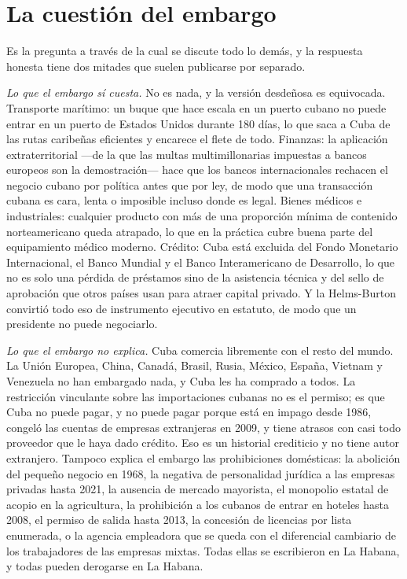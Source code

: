 \section{La cuestión del embargo}

Es la pregunta a través de la cual se discute todo lo demás, y la respuesta honesta
tiene dos mitades que suelen publicarse por separado.

\emph{Lo que el embargo sí cuesta.} No es nada, y la versión desdeñosa es
equivocada. Transporte marítimo: un buque que hace escala en un puerto cubano no
puede entrar en un puerto de Estados Unidos durante 180 días, lo que saca a Cuba de
las rutas caribeñas eficientes y encarece el flete de todo. Finanzas: la aplicación
extraterritorial ---de la que las multas multimillonarias impuestas a bancos
europeos son la demostración--- hace que los bancos internacionales rechacen el
negocio cubano por política antes que por ley, de modo que una transacción cubana es
cara, lenta o imposible incluso donde es legal. Bienes médicos e industriales:
cualquier producto con más de una proporción mínima de contenido norteamericano
queda atrapado, lo que en la práctica cubre buena parte del equipamiento médico
moderno. Crédito: Cuba está excluida del Fondo Monetario Internacional, el Banco
Mundial y el Banco Interamericano de Desarrollo, lo que no es solo una pérdida de
préstamos sino de la asistencia técnica y del sello de aprobación que otros países
usan para atraer capital privado. Y la Helms-Burton convirtió todo eso de
instrumento ejecutivo en estatuto, de modo que un presidente no puede negociarlo.

\emph{Lo que el embargo no explica.} Cuba comercia libremente con el resto del
mundo. La Unión Europea, China, Canadá, Brasil, Rusia, México, España, Vietnam y
Venezuela no han embargado nada, y Cuba les ha comprado a todos. La restricción
vinculante sobre las importaciones cubanas no es el permiso; es que Cuba no puede
pagar, y no puede pagar porque está en impago desde 1986, congeló las cuentas de
empresas extranjeras en 2009, y tiene atrasos con casi todo proveedor que le haya
dado crédito. Eso es un historial crediticio y no tiene autor extranjero. Tampoco
explica el embargo las prohibiciones domésticas: la abolición del pequeño negocio en
1968, la negativa de personalidad jurídica a las empresas privadas hasta 2021, la
ausencia de mercado mayorista, el monopolio estatal de acopio en la agricultura, la
prohibición a los cubanos de entrar en hoteles hasta 2008, el permiso de salida
hasta 2013, la concesión de licencias por lista enumerada, o la agencia empleadora
que se queda con el diferencial cambiario de los trabajadores de las empresas
mixtas. Todas ellas se escribieron en La Habana, y todas pueden derogarse en La
Habana.

